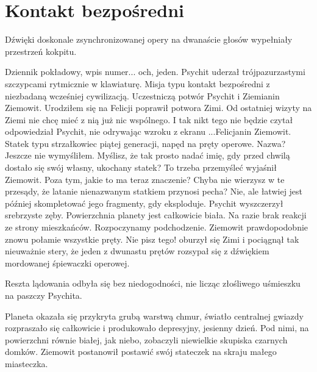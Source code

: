 \chapter{Kontakt bezpośredni}


Dźwięki doskonale zsynchronizowanej opery na dwanaście głosów wypełniały przestrzeń kokpitu.

\begin{dialogue}
\ds{} Dziennik pokładowy, wpis numer... och, jeden. \dm{} Psychit uderzał trójpazurzastymi szczypcami rytmicznie w klawiaturę. \dm{}
Misja typu kontakt bezpośredni z niezbadaną wcześniej cywilizacją. Uczestniczą potwór Psychit i Ziemianin Ziemowit.
\ds{} Urodziłem się na Felicji \dm{} poprawił potwora Zimi. \dm{} Od ostatniej wizyty na Ziemi nie chcę mieć z nią już nic wspólnego.
\ds{} I tak nikt tego nie będzie czytał \dm{} odpowiedział Psychit, nie odrywając wzroku z ekranu \dm{} ...Felicjanin Ziemowit.
Statek typu strzałkowiec piątej generacji, napęd na pręty operowe. Nazwa?
\ds{} Jeszcze nie wymyśliłem. Myślisz, że tak prosto nadać imię, gdy przed chwilą dostało się swój własny, ukochany statek? To trzeba przemyśleć \dm{}
wyjaśnił Ziemowit. \dm{} Poza tym, jakie to ma teraz znaczenie? Chyba nie wierzysz w te przesądy, że latanie nienazwanym statkiem przynosi pecha?
\ds{} Nie, ale łatwiej jest później skompletować jego fragmenty, gdy eksploduje. \dm{} Psychit wyszczerzył srebrzyste zęby. \dm{}
Powierzchnia planety jest całkowicie biała. Na razie brak reakcji ze strony mieszkańców. Rozpoczynamy podchodzenie.
Ziemowit prawdopodobnie znowu połamie wszystkie pręty.
\ds{} Nie pisz tego! \dm{} oburzył się Zimi i pociągnął tak nieuważnie stery, że jeden z dwunastu prętów rozsypał się z dźwiękiem mordowanej śpiewaczki operowej.
\end{dialogue}

Reszta lądowania odbyła się bez niedogodności, nie licząc złośliwego uśmieszku na paszczy Psychita.

\divider{}

Planeta okazała się przykryta grubą warstwą chmur, światło centralnej gwiazdy rozpraszało się całkowicie i produkowało depresyjny, jesienny dzień.
Pod nimi, na powierzchni równie białej, jak niebo, zobaczyli niewielkie skupiska czarnych domków. 
Ziemowit postanowił postawić swój stateczek na skraju małego miasteczka.

